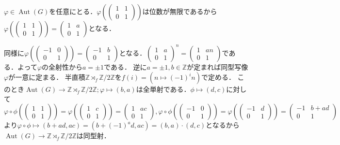 \documentclass[
		book,
		head_space=20mm,
		foot_space=20mm,
		gutter=10mm,
		line_length=190mm
]{jlreq}
\begin{document}
    $\varphi\in {\mathop{\mathrm{Aut}}}(G)$を任意にとる．$\varphi\left(\begin{pmatrix}
    1 & 1 \\
    0 & 1
    \end{pmatrix}\right)$は位数が無限であるから$\varphi\left(\begin{pmatrix}
        1 & 1 \\
        0 & 1
        \end{pmatrix}\right)=\begin{pmatrix}
    1 & a \\
    0 & 1
    \end{pmatrix}$となる．

    同様に$\varphi\left(\begin{pmatrix}
    -1 & 0 \\
    0 & 1
    \end{pmatrix}\right)=\begin{pmatrix}
    -1 & b \\
    0 & 1
    \end{pmatrix}$となる．$\begin{pmatrix}
    1 & a \\
    0 & 1
    \end{pmatrix}^n=\begin{pmatrix}
    1 & an \\
    0 & 1
    \end{pmatrix}$である．よって$\varphi$の全射性から$a=\pm 1$である．
    逆に$a=\pm 1,b\in \mathbb{Z}$が定まれば同型写像$\varphi$が一意に定まる．
    半直積$\mathbb{Z} \rtimes_f \mathbb{Z}/2\mathbb{Z}$を$f(i)=(n\mapsto (-1)^i n)$で定める．
    このとき${\mathop{\mathrm{Aut}}}(G)\rightarrow \mathbb{Z} \rtimes_f \mathbb{Z}/2\mathbb{Z};\varphi \mapsto (b,a)$は全単射である．$\phi \mapsto (d,c)$に対して$\varphi \circ \phi\left( \begin{pmatrix}
    1 & 1 \\
    0 & 1
    \end{pmatrix} \right)=\varphi\left( \begin{pmatrix}
    1 & c \\
    0 & 1
    \end{pmatrix} \right)=\begin{pmatrix}
    1 & ac \\
    0 & 1
    \end{pmatrix},\varphi\circ \phi\left( \begin{pmatrix}
    -1 & 0 \\
    0 & 1
    \end{pmatrix} \right)=\varphi\left( \begin{pmatrix}
    -1 & d \\
    0 & 1
    \end{pmatrix} \right)=\begin{pmatrix}
        -1 & b+ad \\
        0 & 1
        \end{pmatrix}$より$\varphi \circ \phi \mapsto (b+ad,ac)=(b+(-1)^ad,ac)=(b,a)\cdot (d,c)$となるから$ {\mathop{\mathrm{Aut}}}(G)\rightarrow \mathbb{Z} \rtimes_f \mathbb{Z}/2\mathbb{Z}$は同型射．
\end{document}
